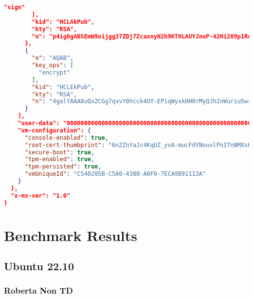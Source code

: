 \begin{lstlisting}[language=json]
          "sign"
        ],
        "kid": "HCLAkPub",
        "kty": "RSA",
        "n": "p4ig6gABSEmW9oijgg37ZDj7ZcaxnyN2h9KTHLAUYJnoP-42Hi209p1RdiL3HSWdRzzSDuXKjQw2kzlmcX1XfBq9-3-L-CVoyCvpiin-6k9L_Rbu0upEiBnIw2IzJ5N6EZx7zfX8vdh76MMnT-_U2Pd2psoiUufzNvs2-5d0QB5NyTuCnXbWD_yWb1OQWZAPioXEIyR13ic-FxPt5UiGG6kBjGp41rqlEQ0B_tsfn3e19_lTx76wVfEkEOw5Yq60rTyNuxiOnR59reaxXui0qJTOkoiDOJ-tHLffY_jTT-8EUFtWS1mcPoye2uKRhAI99xjTWg88Ft4sIUv8stOTvw"
      },
      {
        "e": "AQAB",
        "key_ops": [
          "encrypt"
        ],
        "kid": "HCLEkPub",
        "kty": "RSA",
        "n": "4galYAAA8uQxZCGg7qvvY0hcck4UY-EPiqWyxkHH0rMyQJh2nWuriu5wrh4JPPy6HvtX5M-mr5ecHPYf4S0qTOcqWZX01Uj8Ky1sbvA6g1GELe0Jdqf9piQDmS90dGwR6PItHMObnejzBocweHxkuSm7pGSuOAniX6KDid1hsxED5gYLxg2wHAXFICz9UZOTQ6FZmezVz0Krpr2AF4fKawOIaQSwNl7GIjH09x7rFRP2H1zOW6sJYAIAIT7F7vfncB3ZpPHUrU9U-qSQC2LZBRtjuBaKG-kGU6jAOkMC8aXu_pb99vgrrJpn2Nf8VodePJ7gzwladZjCnflyUWViYw"
      }
    ],
    "user-data": "00000000000000000000000000000000000000000000000000000000000000000000000000000000000000000000000000000000000000000000000000000000",
    "vm-configuration": {
      "console-enabled": true,
      "root-cert-thumbprint": "6nZZnYaJc4KqUZ_yvA-mucFdYNouvlPnITnNMXsHl-0",
      "secure-boot": true,
      "tpm-enabled": true,
      "tpm-persisted": true,
      "vmUniqueId": "C540205B-C5A0-4380-A0F9-7ECA9B91113A"
    }
  },
  "x-ms-ver": "1.0"
}
\end{lstlisting}


\section{Benchmark Results}
\subsection{Ubuntu 22.10}
\subsubsection{Roberta Non TD}
\label{sec:appendix:benchmarks:roberta}

